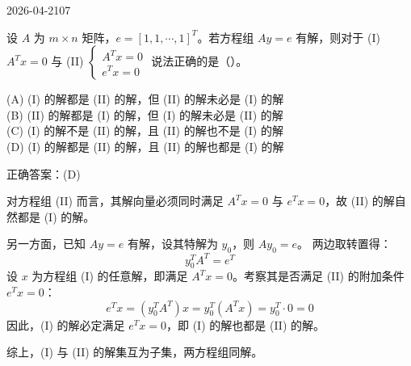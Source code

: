\begin{mistake}{2026-04-21}{07}

\begin{problemcontent}
设 \(A\) 为 \(m \times n\) 矩阵，\(e = [1, 1, \cdots, 1]^T\)。若方程组 \(Ay=e\) 有解，则对于 (I) \(A^T x = 0\) 与 (II) \(\begin{cases} A^T x = 0 \\ e^T x = 0 \end{cases}\) 说法正确的是（\quad）。

(A) (I) 的解都是 (II) 的解，但 (II) 的解未必是 (I) 的解 \\
(B) (II) 的解都是 (I) 的解，但 (I) 的解未必是 (II) 的解 \\
(C) (I) 的解不是 (II) 的解，且 (II) 的解也不是 (I) 的解 \\
(D) (I) 的解都是 (II) 的解，且 (II) 的解也都是 (I) 的解
\end{problemcontent}

\begin{solutioncontent}
正确答案：(D)

对方程组 (II) 而言，其解向量必须同时满足 \(A^T x = 0\) 与 \(e^T x = 0\)，故 (II) 的解自然都是 (I) 的解。

另一方面，已知 \(Ay=e\) 有解，设其特解为 \(y_0\)，则 \(Ay_0=e\)。
两边取转置得：
\[
y_0^T A^T = e^T
\]
设 \(x\) 为方程组 (I) 的任意解，即满足 \(A^T x = 0\)。考察其是否满足 (II) 的附加条件 \(e^T x = 0\)：
\[
e^T x = (y_0^T A^T) x = y_0^T (A^T x) = y_0^T \cdot 0 = 0
\]
因此，(I) 的解必定满足 \(e^T x = 0\)，即 (I) 的解也都是 (II) 的解。

综上，(I) 与 (II) 的解集互为子集，两方程组同解。
\end{solutioncontent}


\end{mistake}
